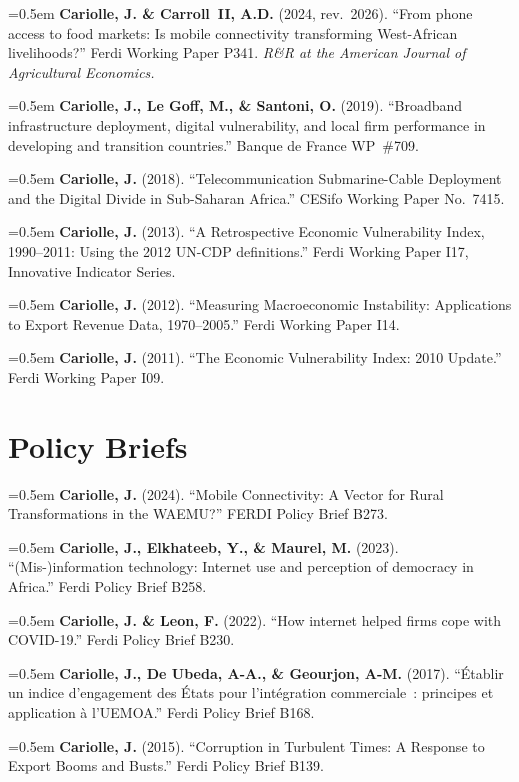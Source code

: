 \documentclass[11pt, a4paper]{article}
\newcommand{\cvpub}[1]{\noindent\hangindent=0.5em\hangafter=1 #1\par\vspace{5pt}}
\begin{document}
\cvpub{\textbf{Cariolle, J. \& Carroll~II, A.D.} (2024, rev.\ 2026). ``From phone access to food markets: Is mobile connectivity transforming West-African livelihoods?'' Ferdi Working Paper P341. \textit{R\&R at the American Journal of Agricultural Economics.}}

\cvpub{\textbf{Cariolle, J., Le Goff, M., \& Santoni, O.} (2019). ``Broadband infrastructure deployment, digital vulnerability, and local firm performance in developing and transition countries.'' Banque de France WP~\#709.}

\cvpub{\textbf{Cariolle, J.} (2018). ``Telecommunication Submarine-Cable Deployment and the Digital Divide in Sub-Saharan Africa.'' CESifo Working Paper No.~7415.}

\cvpub{\textbf{Cariolle, J.} (2013). ``A Retrospective Economic Vulnerability Index, 1990--2011: Using the 2012 UN-CDP definitions.'' Ferdi Working Paper I17, Innovative Indicator Series.}

\cvpub{\textbf{Cariolle, J.} (2012). ``Measuring Macroeconomic Instability: Applications to Export Revenue Data, 1970--2005.'' Ferdi Working Paper I14.}

\cvpub{\textbf{Cariolle, J.} (2011). ``The Economic Vulnerability Index: 2010 Update.'' Ferdi Working Paper I09.}

\section{Policy Briefs}

\cvpub{\textbf{Cariolle, J.} (2024). ``Mobile Connectivity: A Vector for Rural Transformations in the WAEMU?'' FERDI Policy Brief B273.}

\cvpub{\textbf{Cariolle, J., Elkhateeb, Y., \& Maurel, M.} (2023). ``(Mis-)information technology: Internet use and perception of democracy in Africa.'' Ferdi Policy Brief B258.}

\cvpub{\textbf{Cariolle, J. \& Leon, F.} (2022). ``How internet helped firms cope with COVID-19.'' Ferdi Policy Brief B230.}

\cvpub{\textbf{Cariolle, J., De Ubeda, A-A., \& Geourjon, A-M.} (2017). ``\'{E}tablir un indice d'engagement des \'{E}tats pour l'int\'{e}gration commerciale~: principes et application \`{a} l'UEMOA.'' Ferdi Policy Brief B168.}

\cvpub{\textbf{Cariolle, J.} (2015). ``Corruption in Turbulent Times: A Response to Export Booms and Busts.'' Ferdi Policy Brief B139.}
\end{document}
